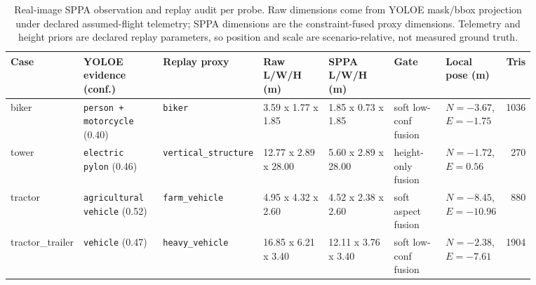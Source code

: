 \documentclass[10pt]{article}
\begin{document}
\begin{table}[H]
\centering
\scriptsize
\setlength{\tabcolsep}{3pt}
\renewcommand{\arraystretch}{1.06}
\caption{Real-image SPPA observation and replay audit per probe. Raw
dimensions come from YOLOE mask/bbox projection under declared assumed-flight
telemetry; SPPA dimensions are the constraint-fused proxy dimensions.
Telemetry and height priors are declared replay parameters, so position and
scale are scenario-relative, not measured ground truth.}
\label{tab:sppa-observation-fusion-audit}
\begin{tabularx}{\linewidth}{@{}L{0.10\linewidth}L{0.16\linewidth}L{0.11\linewidth}L{0.14\linewidth}L{0.14\linewidth}L{0.11\linewidth}L{0.11\linewidth}r@{}}
\toprule
Case & YOLOE evidence (conf.) & Replay proxy & Raw L/W/H (m) & SPPA L/W/H (m) & Gate & Local pose (m) & Tris \\
\midrule
biker & \texttt{person + motorcycle} (0.40) & \texttt{biker} & 3.59 x 1.77 x 1.85 & 1.85 x 0.73 x 1.85 & soft low-conf fusion & $N=-3.67$, $E=-1.75$ & 1036 \\
tower & \texttt{electric pylon} (0.46) & \texttt{vertical\_structure} & 12.77 x 2.89 x 28.00 & 5.60 x 2.89 x 28.00 & height-only fusion & $N=-1.72$, $E=0.56$ & 270 \\
tractor & \texttt{agricultural vehicle} (0.52) & \texttt{farm\_vehicle} & 4.95 x 4.32 x 2.60 & 4.52 x 2.38 x 2.60 & soft aspect fusion & $N=-8.45$, $E=-10.96$ & 880 \\
tractor\_trailer & \texttt{vehicle} (0.47) & \texttt{heavy\_vehicle} & 16.85 x 6.21 x 3.40 & 12.11 x 3.76 x 3.40 & soft low-conf fusion & $N=-2.38$, $E=-7.61$ & 1904 \\
\bottomrule
\end{tabularx}
\end{table}
\end{document}
